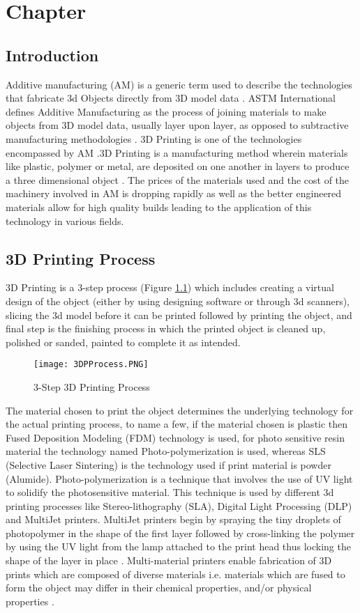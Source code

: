 \chapter{Chapter}
\section{Introduction}
Additive manufacturing (AM) is a generic term used to describe the technologies that fabricate 3d Objects directly from 3D model data \cite{KRUTH}. ASTM International defines Additive Manufacturing as the process of joining materials to make objects from 3D model data, usually layer upon layer, as opposed to subtractive manufacturing methodologies \cite{cwig} . 3D Printing is one of the technologies encompassed by AM \cite{Conner}.3D Printing is a manufacturing method  wherein materials like plastic, polymer or metal, are deposited on one another in layers to produce a three dimensional object \cite{sdl}.  The prices of the materials used and the cost of the machinery involved in AM is dropping rapidly as well as the better engineered materials allow for high quality builds leading to the application of this technology in various fields. 

\section{3D Printing Process}

3D Printing is a 3-step process (Figure \ref{fig:3DP}) which includes creating a virtual design of the object (either by using designing software or through 3d scanners), slicing the 3d model before it can be printed followed by printing the object, and final step is the finishing process in which the printed object is cleaned up, polished or sanded, painted to complete it as intended.  
\begin{figure}[ht!]
\centering
\texttt{[image: 3DPProcess.PNG]}
\caption{3-Step 3D Printing Process}
\label{fig:3DP}
\end{figure}

The material chosen to print the object determines the underlying technology for the actual printing process, to name a few, if the material chosen is plastic then Fused Deposition Modeling (FDM) technology is used, for photo sensitive resin material the technology named Photo-polymerization is used, whereas SLS (Selective Laser Sintering) is the technology used if print material is powder (Alumide). Photo-polymerization is a technique that involves the use of UV light to solidify the photosensitive material.  This technique is used by different 3d printing processes like Stereo-lithography (SLA), Digital Light Processing (DLP) and MultiJet printers.  MultiJet printers begin by spraying the tiny droplets of photopolymer in the shape of the first layer followed by cross-linking the polymer by using the UV light from the lamp attached to the print head thus locking the shape of the layer in place \cite{dpW}. Multi-material printers enable fabrication of 3D prints which are composed of diverse materials i.e. materials which are fused to form the object may differ in their chemical properties, and/or physical properties \cite{Doubrovski}.\newline

